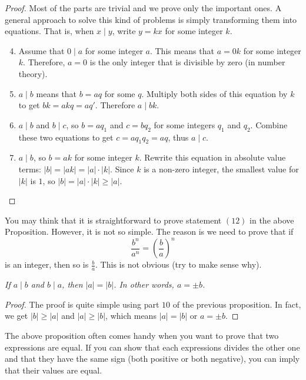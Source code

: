 \documentclass{subfile}
\begin{document}
	\begin{proof}
		Most of the parts are trivial and we prove only the important ones. A general approach to solve this kind of problems is simply transforming them into equations. That is, when $x\mid y$, write $y=kx$ for some integer $k$.
		\begin{enumerate}
			\setcounter{enumi}{3}
			\item Assume that $0\mid a$ for some integer $a$. This means that $a=0k$ for some integer $k$. Therefore, $a=0$ is the only integer that is divisible by zero (in number theory).
			\setcounter{enumi}{5}
			\item $a\mid b$ means that $b=aq$ for some $q$. Multiply both sides of this equation by $k$ to get $bk = akq=aq'$. Therefore $a\mid bk$.
			\setcounter{enumi}{8}
			\item $a\mid b$ and $b\mid c$, so $b=aq_1$ and $c=bq_2$ for some integers $q_1$ and $q_2$. Combine these two equations to get $c = aq_1q_2 = aq$, thus $a\mid c$.
			\setcounter{enumi}{9}
			\item $a\mid b$, so $b = ak$ for some integer $k$. Rewrite this equation in absolute value terms: $|b| = |ak| = |a| \cdot |k|$. Since $k$ is a non-zero integer, the smallest value for $|k|$ is $1$, so $|b| = |a| \cdot |k| \geq |a|$.
			\setcounter{enumi}{11}
		\end{enumerate}
	\end{proof}
	
	\begin{note}
	    You may think that it is straightforward to prove statement $(12)$ in the above Proposition. However, it is not so simple. The reason is we need to prove that if $$\frac{b^n}{a^n}=\left(\frac{b}{a}\right)^n$$ is an integer, then so is $\frac{b}{a}$. This is not obvious (try to make sense why).
	\end{note}

	\begin{proposition}\slshape\label{prop:bothdivide}
		If $a \mid b$ and $b \mid a$, then  $|a|=|b|$. In other words, $a=\pm b$.
	\end{proposition}

	\begin{proof}
		The proof is quite simple using part $10$ of the previous proposition. In fact, we get $|b| \geq |a|$ and $|a| \geq |b|$, which means $|a| = |b|$ or $a = \pm b$.
	\end{proof}
	The above proposition often comes handy when you want to prove that two expressions are equal. If you can show that each expressions divides the other one and that they have the same sign (both positive or both negative), you can imply that their values are equal.
\end{document}
